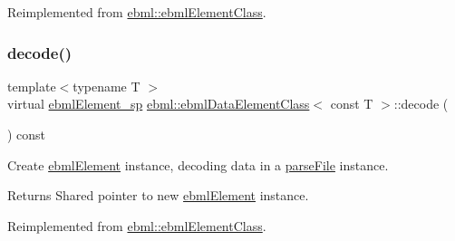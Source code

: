 Reimplemented from \mbox{\hyperlink{classebml_1_1ebmlElementClass_a9bda26f54e5d5a1e27aaaf0e124ec457}{ebml\+::ebml\+Element\+Class}}.

\mbox{\label{classebml_1_1ebmlDataElementClass_3_01const_01T_01_4_a8e55ca5bba1f4406920f75cd9b0e9bbc}} 
\subsubsection{\texorpdfstring{decode()}{decode()}\hspace{0.1cm}{\footnotesize\ttfamily [2/2]}}
{\footnotesize\ttfamily template$<$typename T $>$ \\
virtual \mbox{\hyperlink{namespaceebml_adad533b7705a16bb360fe56380c5e7be}{ebml\+Element\+\_\+sp}} \mbox{\hyperlink{classebml_1_1ebmlDataElementClass}{ebml\+::ebml\+Data\+Element\+Class}}$<$ const T $>$\+::decode (\begin{DoxyParamCaption}\item[{const \mbox{\hyperlink{classebml_1_1parseFile}{parse\+File}} \&}]{ }\end{DoxyParamCaption}) const\hspace{0.3cm}{\ttfamily [virtual]}}

Create \mbox{\hyperlink{classebml_1_1ebmlElement}{ebml\+Element}} instance, decoding data in a \mbox{\hyperlink{classebml_1_1parseFile}{parse\+File}} instance.

\begin{DoxyReturn}{Returns}
Shared pointer to new \mbox{\hyperlink{classebml_1_1ebmlElement}{ebml\+Element}} instance. 
\end{DoxyReturn}


Reimplemented from \mbox{\hyperlink{classebml_1_1ebmlElementClass_a94461f09e1c1c57ffe86febb9710edc7}{ebml\+::ebml\+Element\+Class}}.

\mbox{\label{classebml_1_1ebmlDataElementClass_3_01const_01T_01_4_a7873f495e6b29cca5f3d73e0e34873f5}} 
